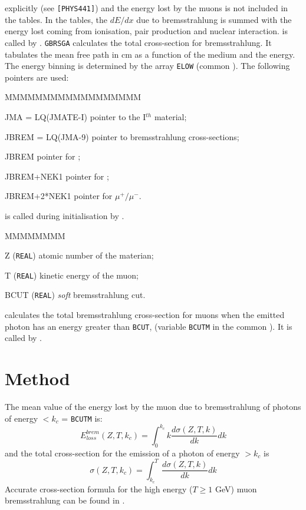 explicitly (see {\tt [PHYS441]}) and the energy lost by the muons is
not included in the tables. 
In the tables, the $dE/dx$ due to bremsstrahlung is summed with
the energy lost coming from ionisation, pair production and nuclear interaction.
 is called by .
{\tt  GBRSGA} calculates the total cross-section for bremsstrahlung.
It tabulates the mean free path
in cm as a function of the medium and the energy. The energy
binning is determined by the array {\tt ELOW} (common ).
The following pointers are used:
\begin{DLtt}{MMMMMMMMMMMMMMMMMM}
\item[JMA = LQ(JMATE-I)]pointer to the I$^{th}$ material;
\item[JBREM = LQ(JMA-9)]pointer to bremsstrahlung cross-sections;
\item[JBREM            ]pointer for \Pem;
\item[JBREM+NEK1       ]pointer for \Pep;
\item[JBREM+2*NEK1     ]pointer for $\mu^+/\mu^-$.
\end{DLtt}
 is called during initialisation by .
\begin{DLtt}{MMMMMMMM}
\item[Z] ({\tt REAL}) atomic number of the materian;
\item[T] ({\tt REAL}) kinetic energy of the muon;
\item[BCUT] ({\tt REAL}) {\it soft} bremsstrahlung cut.
\end{DLtt}
 calculates the total bremsstrahlung cross-section for
muons when the emitted photon has an energy greater than {\tt BCUT}, 
(variable {\tt BCUTM} in the common ). It is called
by .
\section{Method}
 
The mean value of the energy lost by the muon due to bremsstrahlung of
photons of energy $<k_{c}$ = {\tt BCUTM} is:
\begin{equation}
\label{eq:phys440-1}
E_{loss}^{brem}(Z,T,k_c ) = \int_{0}^{k_c} k
        \frac{d \sigma (Z,T,k)}{dk}dk
\end{equation}
and the total cross-section for the emission of a photon of energy
$ > k_c $ is
\begin {equation}
\label{eq:phys440-2}
 \sigma (Z,T,k_c ) = \int_{k_c}^{T}
        \frac{d \sigma (Z,T,k)} {dk} dk
\end{equation}
Accurate cross-section formula for the high energy ($T \geq 1$ GeV)
muon bremsstrahlung can be found in \cite{bib-LOHM}.

